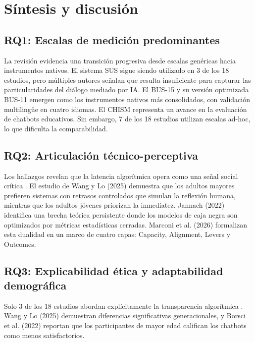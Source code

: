 \documentclass[11pt,twocolumn]{article}
\begin{document}
\section{Síntesis y discusión}

\subsection{RQ1: Escalas de medición predominantes}

La revisión evidencia una transición progresiva desde escalas genéricas hacia instrumentos nativos. El sistema SUS sigue siendo utilizado en 3 de los 18 estudios, pero múltiples autores \cite{borsci2021, marconi2026} señalan que resulta insuficiente para capturar las particularidades del diálogo mediado por IA. El BUS-15 y su versión optimizada BUS-11 \cite{borsci2022} emergen como los instrumentos nativos más consolidados, con validación multilingüe en cuatro idiomas. El CHISM \cite{belda2023} representa un avance en la evaluación de chatbots educativos. Sin embargo, 7 de los 18 estudios utilizan escalas ad-hoc, lo que dificulta la comparabilidad.

\subsection{RQ2: Articulación técnico-perceptiva}

Los hallazgos revelan que la latencia algorítmica opera como una señal social crítica \cite{wang2025}. El estudio de Wang y Lo (2025) \cite{wang2025} demuestra que los adultos mayores prefieren sistemas con retrasos controlados que simulan la reflexión humana, mientras que los adultos jóvenes priorizan la inmediatez. Jannach (2022) \cite{jannach2022} identifica una brecha teórica persistente donde los modelos de caja negra son optimizados por métricas estadísticas cerradas. Marconi et al. (2026) \cite{marconi2026} formalizan esta dualidad en un marco de cuatro capas: Capacity, Alignment, Levers y Outcomes.

\subsection{RQ3: Explicabilidad ética y adaptabilidad demográfica}

Solo 3 de los 18 estudios abordan explícitamente la transparencia algorítmica \cite{jannach2022, marconi2026, bielawski2022}. Wang y Lo (2025) \cite{wang2025} demuestran diferencias significativas generacionales, y Borsci et al. (2022) \cite{borsci2022} reportan que los participantes de mayor edad califican los chatbots como menos satisfactorios.
\end{document}
